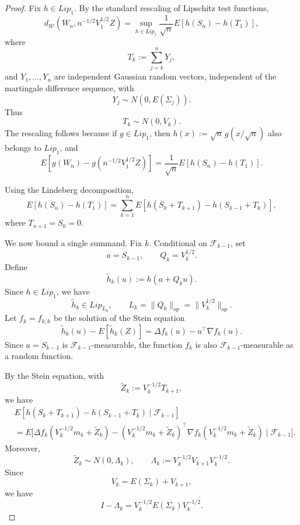 \documentclass[10pt,a4paper]{article}
\begin{document}
\begin{proof}
Fix \(h\in Lip_1\). By the standard rescaling of Lipschitz test functions,
\[
d_{\mathcal W}(W_n,n^{-1/2}V_1^{1/2}Z)
=
\sup_{h\in Lip_1}
\frac{1}{\sqrt n}
E\left[h(S_n)-h(T_1)\right],
\]
where
\[
    T_k:=\sum_{j=k}^n Y_j,
\]
and \(Y_1,\ldots,Y_n\) are independent Gaussian random vectors, independent
of the martingale difference sequence, with
\[
    Y_j\sim N(0,E(\Sigma_j)).
\]
Thus
\[
    T_k\sim N(0,V_k).
\]
The rescaling follows because if \(g\in Lip_1\), then
\(h(x):=\sqrt n\,g(x/\sqrt n)\) also belongs to \(Lip_1\), and
\[
E\left[g(W_n)-g(n^{-1/2}V_1^{1/2}Z)\right]
=
\frac{1}{\sqrt n}
E\left[h(S_n)-h(T_1)\right].
\]

Using the Lindeberg decomposition,
\[
E\left[h(S_n)-h(T_1)\right]
=
\sum_{k=1}^n
E\left[
h(S_k+T_{k+1})-h(S_{k-1}+T_k)
\right],
\]
where \(T_{n+1}=S_0=0\).

We now bound a single summand. Fix \(k\). Conditional on
\(\mathcal F_{k-1}\), set
\[
    a=S_{k-1},
    \qquad
    Q_k=V_k^{1/2}.
\]
Define
\[
    \widetilde h_k(u):=h(a+Q_k u).
\]
Since \(h\in Lip_1\), we have
\[
    \widetilde h_k\in Lip_{L_k},
    \qquad
    L_k=\|Q_k\|_{op}=\|V_k^{1/2}\|_{op}.
\]
Let \(f_k=f_{k,h}\) be the solution of the Stein equation
\[
    \widetilde h_k(u)-E[\widetilde h_k(Z)]
    =
    \Delta f_k(u)-u^\top\nabla f_k(u).
\]
Since \(a=S_{k-1}\) is \(\mathcal F_{k-1}\)-measurable, the function
\(f_k\) is also \(\mathcal F_{k-1}\)-measurable as a random function.

By the Stein equation, with
\[
    \widetilde Z_k:=V_k^{-1/2}T_{k+1},
\]
we have
\begin{align*}
& E\left[
h(S_k+T_{k+1})-h(S_{k-1}+T_k)
\mid
\mathcal F_{k-1}
\right]
\\
&=
E\biggl[
\Delta f_k\left(V_k^{-1/2}m_k+\widetilde Z_k\right)
-
\left(V_k^{-1/2}m_k+\widetilde Z_k\right)^\top
\nabla f_k\left(V_k^{-1/2}m_k+\widetilde Z_k\right)
\mid
\mathcal F_{k-1}
\biggr].
\end{align*}
Moreover,
\[
    \widetilde Z_k
    \sim
    N(0,\Lambda_k),
    \qquad
    \Lambda_k:=V_k^{-1/2}V_{k+1}V_k^{-1/2}.
\]
Since
\[
    V_k=E(\Sigma_k)+V_{k+1},
\]
we have
\[
    I-\Lambda_k
    =
    V_k^{-1/2}E(\Sigma_k)V_k^{-1/2}.
\]


\end{proof}
\end{document}
